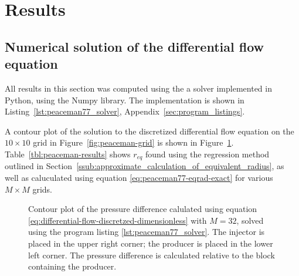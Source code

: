 
\section{Results} %
\label{sec:results}




\subsection{Numerical solution of the differential flow equation} %
\label{sub:numerical_solution_of_the_differential_flow_equation}
All results in this section was computed using the a solver implemented in Python, using the Numpy library. The implementation is shown in Listing~\ref{lst:peaceman77_solver}, Appendix~\ref{sec:program_listings}.

A contour plot of the solution to the discretized differential flow equation on the $10 \times 10$ grid in Figure~\ref{fig:peaceman-grid} is shown in Figure~\ref{fig:pressure_drop_contour}. Table~\ref{tbl:peaceman-results} shows $r_{eq}$ found using the regression method outlined in Section~\ref{ssub:approximate_calculation_of_equivalent_radius}, as well as caluculated using equation \eqref{eq:peaceman77-eqrad-exact} for various $M\times M$ grids.



\begin{figure}[htbp]
    \centering
    \scalebox{0.7}{}
    \caption{Contour plot of the pressure difference calulated using equation \eqref{eq:differential-flow-discretzed-dimensionless} with $M=32$, solved using the program listing \ref{lst:peaceman77_solver}. The injector is placed in the upper right corner; the producer is placed in the lower left corner. The pressure difference is calculated relative to the block containing the producer.}
    \label{fig:pressure_drop_contour}
\end{figure}


